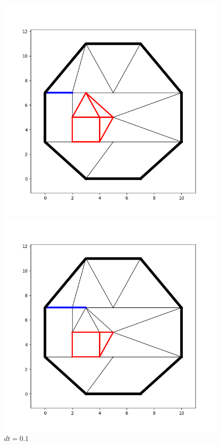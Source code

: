 \documentclass[10pt]{article}
\begin{document}
\begin{figure}[H]
    \centering
    \begin{minipage}{.4\linewidth}
        \centering
        \includegraphics[width=1\textwidth]{images/Figure_5.png}
        \caption{$dt=0.1$}
        \label{fig:prob1_6_2}
    \end{minipage}%
    \begin{minipage}{.4\linewidth}
        \centering
        \includegraphics[width=1\textwidth]{images/Figure_6.png}
        \caption{$dt=0.1$}
        \label{fig:prob1_6_2}
    \end{minipage}
\end{figure}
\end{document}
